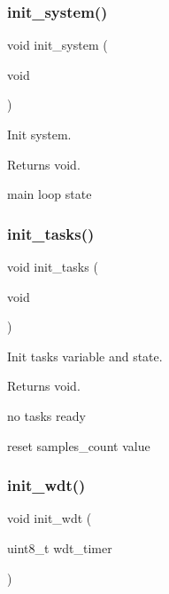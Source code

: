 \subsubsection{\texorpdfstring{init\+\_\+system()}{init\_system()}}
{\footnotesize\ttfamily void init\+\_\+system (\begin{DoxyParamCaption}\item[{void}]{ }\end{DoxyParamCaption})}



Init system. 

\begin{DoxyReturn}{Returns}
void. 
\end{DoxyReturn}
main loop state \mbox{\label{rmap_8ino_ab4bf0a3d77da083f131d3fa35a37d2b1}} 
\subsubsection{\texorpdfstring{init\+\_\+tasks()}{init\_tasks()}}
{\footnotesize\ttfamily void init\+\_\+tasks (\begin{DoxyParamCaption}\item[{void}]{ }\end{DoxyParamCaption})}



Init tasks variable and state. 

\begin{DoxyReturn}{Returns}
void. 
\end{DoxyReturn}
no tasks ready

reset samples\+\_\+count value \mbox{\label{rmap_8ino_a980e73df66b14b1190bc25da430a4f12}} 
\subsubsection{\texorpdfstring{init\+\_\+wdt()}{init\_wdt()}}
{\footnotesize\ttfamily void init\+\_\+wdt (\begin{DoxyParamCaption}\item[{uint8\+\_\+t}]{wdt\+\_\+timer }\end{DoxyParamCaption})}



